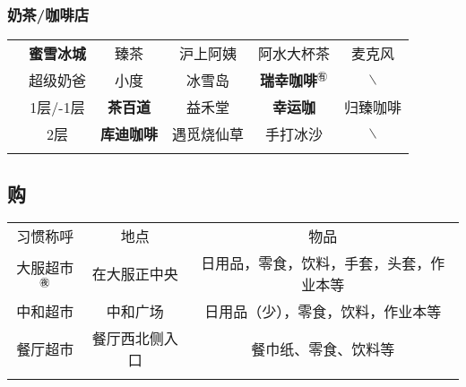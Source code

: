 \subsubsection[奶茶/咖啡店]{奶茶/咖啡店}
\begin{table}[H]
    \centering
    \begin{tabular}{|c|c|c|c|c|c|}
        \Xhline{1.2pt}
        \multirow{2}{*}{食堂} & \textbf{蜜雪冰城}       & 臻茶            & 沪上阿姨  %
                            & 阿水大杯茶               & 麦克风                   \\
        \cline{2-6}
                            & 超级奶爸                & 小度            & 冰雪岛   %
                            & \textbf{瑞幸咖啡}$^{㊒}$ & $\backslash$          \\
        \Xhline{1.2pt}
        \multirow{2}{*}{大服} & 1层/-1层              & \textbf{茶百道}  & 益禾堂   %
                            & \textbf{幸运咖}        & 归臻咖啡                  \\
        \cline{2-6}
                            & 2层                  & \textbf{库迪咖啡} & 遇觅烧仙草 %
                            & 手打冰沙                & $\backslash$          \\
        \Xhline{1.2pt}
    \end{tabular}
\end{table}

\subsection[购]{购}
\label{market}
\begin{table}[H]
    \centering
    \begin{tabular}{|c|c|c|}
        \Xhline{1.2pt}
        习惯称呼       & 地点      & 物品                   \\
        \Xhline{1.2pt}
        大服超市$^{㊰}$ & 在大服正中央  & 日用品，零食，饮料，手套，头套，作业本等 \\
        \hline
        中和超市       & 中和广场    & 日用品（少），零食，饮料，作业本等    \\
        \hline
        餐厅超市       & 餐厅西北侧入口 & 餐巾纸、零食、饮料等           \\
        \Xhline{1.2pt}
    \end{tabular}
\end{table}

